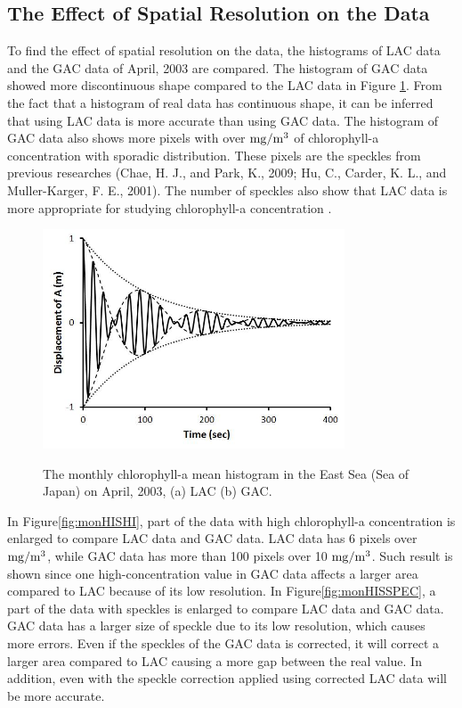 \newpage
\newpage

\subsection{The Effect of Spatial Resolution on the Data}
 
To find the effect of spatial resolution on the data, the histograms of LAC data and the GAC data of April, 2003 are compared. The histogram of GAC data showed more discontinuous shape compared to the LAC data in Figure \ref{fig:monHIS}. From the fact that a histogram of real data has continuous shape, it can be inferred that using LAC data is more accurate than using GAC data. The histogram of GAC data also shows more pixels with over $\rm mg/m^3$ of chlorophyll-a concentration with sporadic distribution. These pixels are the speckles from previous researches (Chae, H. J., and Park, K., 2009; Hu, C., Carder, K. L., and Muller-Karger, F. E., 2001). The number of speckles also show that LAC data is more appropriate for studying chlorophyll-a concentration \cite{chae2009characteristics,hu2001precise}.
  
\begin{figure}[h]
	\centering
	\includegraphics[width=0.8\textwidth]{../images/monHIS}\\
	\scriptsize\caption{The monthly chlorophyll-a mean histogram in the East Sea (Sea of Japan) on April, 2003, (a) LAC (b) GAC.}
	\label{fig:monHIS}
\end{figure}
 
In Figure\ref{fig:monHISHI}, part of the data with high chlorophyll-a concentration is enlarged to compare LAC data and GAC data. LAC data has 6 pixels over $\rm mg/m^3$, while GAC data has more than 100 pixels over 10 $\rm mg/m^3$. Such result is shown since one high-concentration value in GAC data affects a larger area compared to LAC because of its low resolution.
In Figure\ref{fig:monHISSPEC}, a part of the data with speckles is enlarged to compare LAC data and GAC data. GAC data has a larger size of speckle due to its low resolution, which causes more errors. Even if the speckles of the GAC data is corrected, it will correct a larger area compared to LAC causing a more gap between the real value. In addition, even with the speckle correction applied using corrected LAC data will be more accurate.
    
